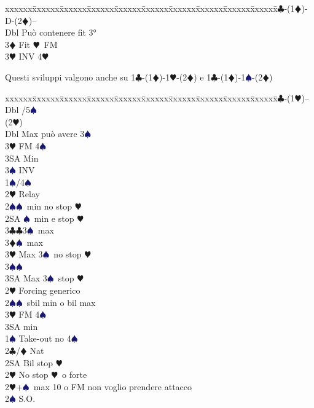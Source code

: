 \documentclass[a4paper,italian]{article}
\newcommand{\BC}{\textcolor{OliveGreen}{$\clubsuit$}}
\newcommand{\BD}{\textcolor{RedOrange}{$\vardiamondsuit$}}
\newcommand{\BH}{\textcolor{Red2}{$\varheartsuit${}}}
\newcommand{\BS}{\textcolor{MidnightBlue}{$\spadesuit${}}}
\newenvironment{bidtable}
{\begin{tabbing}

    xxxxxx\=xxxxxx\=xxxxxx\=xxxxxx\=xxxxxx\=xxxxxx\=xxxxxx\=xxxxxx\=xxxxxx\=xxxxxx\=\kill}
{\end{tabbing} }%
\newenvironment{sviluppi}
{\begin{tcolorbox}[colframe=azzurro,title=Sviluppi particolari]}
    {
\end{tcolorbox} }%
\begin{document}
\begin{multicols}{2}
    \begin{sviluppi}
        \begin{bidtable}
            1\BC-(1\BD)-D-(2\BD)--\+\\
            Dbl \> Può contenere fit 3°\\
            3\BD \> Fit \BH\ FM\\
            3\BH \> INV 4\BH \-
        \end{bidtable}
        \smallbreak
        Questi sviluppi valgono anche su 1\BC -(1\BD )-1\BH -(2\BD ) e 1\BC -(1\BD )-1\BS -(2\BD )
    \end{sviluppi}

    \begin{bidtable}
        1\BC-(1\BH)--\+\\
        Dbl /5\BS \+\\
        (2\BH)\+\\
        Dbl \> Max può avere 3\BS \\
        3\BH \> FM 4\BS \+\\
        3SA \> Min\-\\
        3\BS \> INV\-\\
        1\BS {}/4\BS \+\\
        2\BH \> Relay\+\\
        2\BS {}\BS\ min no stop \BH \\
        2SA \BS\ min e stop \BH \\
        3\BC {}\BC 3\BS\ max\\
        3\BD {}\BS\ max\\
        3\BH \> Max 3\BS\ no stop \BH \\
        3\BS {}\BS \\
        3SA \> Max 3\BS\ stop \BH \-\-\\
        2\BH \> Forcing generico\\
        2\BS {}\BS\ sbil min o bil max\\
        3\BH \> FM 4\BS \+\\
        3SA \> min\-\-\\
        1\BS \> Take-out no 4\BS \\
        2\BC/\BD \> Nat\+\\
        2SA \> Bil stop \BH \\
        2\BH \> No stop \BH\ o forte\-\\
        2\BH {}+\BS\ max 10 o FM non voglio prendere attacco\+\\
        2\BS \> S.O.\+\\

\end{bidtable}
\end{multicols}
\end{document}
